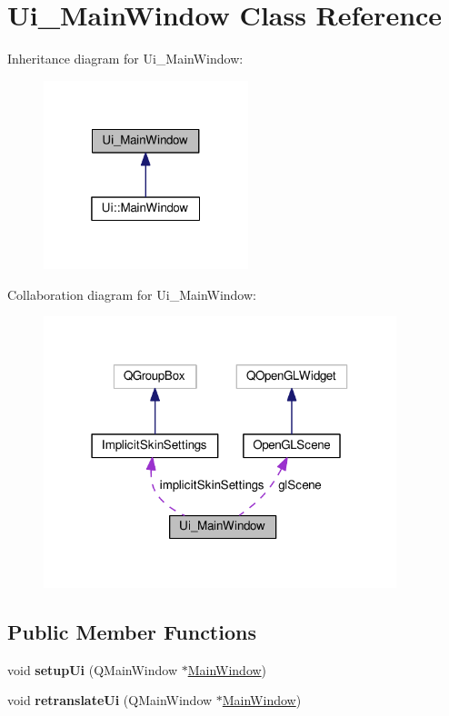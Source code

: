 \hypertarget{classUi__MainWindow}{}\section{Ui\+\_\+\+Main\+Window Class Reference}
\label{classUi__MainWindow}


Inheritance diagram for Ui\+\_\+\+Main\+Window\+:\nopagebreak
\begin{figure}[H]
\begin{center}
\leavevmode
\includegraphics[width=169pt]{d9/dd5/classUi__MainWindow__inherit__graph}
\end{center}
\end{figure}


Collaboration diagram for Ui\+\_\+\+Main\+Window\+:\nopagebreak
\begin{figure}[H]
\begin{center}
\leavevmode
\includegraphics[width=291pt]{d8/d11/classUi__MainWindow__coll__graph}
\end{center}
\end{figure}
\subsection*{Public Member Functions}
\begin{DoxyCompactItemize}
\item 
void {\bfseries setup\+Ui} (Q\+Main\+Window $\ast$\hyperlink{classMainWindow}{Main\+Window})\hypertarget{classUi__MainWindow_acf4a0872c4c77d8f43a2ec66ed849b58}{}\label{classUi__MainWindow_acf4a0872c4c77d8f43a2ec66ed849b58}

\item 
void {\bfseries retranslate\+Ui} (Q\+Main\+Window $\ast$\hyperlink{classMainWindow}{Main\+Window})\hypertarget{classUi__MainWindow_a097dd160c3534a204904cb374412c618}{}\label{classUi__MainWindow_a097dd160c3534a204904cb374412c618}

\end{DoxyCompactItemize}
